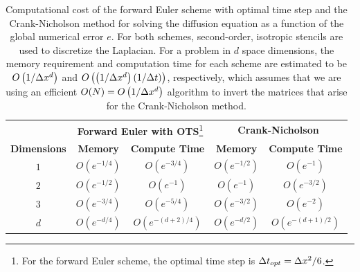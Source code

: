 \documentclass[oneeqnum,onefignum,onetabnum,onethmnum]{siamltex}
\begin{document}
\begin{table}[tb]
\caption{\label{tab:comp_perf_vs_dim}
   Computational cost of the forward Euler scheme with optimal time step and 
   the Crank-Nicholson method for solving the diffusion equation as a function 
   of the global numerical error $e$.
   For both schemes, second-order, isotropic stencils are used to discretize 
   the Laplacian.  For a problem in $d$ space dimensions, the memory 
   requirement and computation time for each scheme are estimated to be 
   $O \left(1/\Delta x^d \right)$ and 
   $O\left( \left(1/\Delta x^d \right) (1/\Delta t) \right)$, respectively, which 
   assumes that we are using an efficient 
   $O(N) = O \left( 1/\Delta x^d \right)$ algorithm to invert the matrices that 
   arise for the Crank-Nicholson method.
}
\begin{minipage}{\textwidth}
\begin{center} \footnotesize
\renewcommand{\arraystretch}{1.5}
\begin{tabular}{|c|c|c|c|c|}
  \hline
  & \multicolumn{2}{|c|}{{\bf Forward Euler with OTS}\footnote{For the forward 
    Euler scheme, the optimal time step is $\Delta t_{opt} = \Delta x^2/6$.}}
  & \multicolumn{2}{|c|}{\bf Crank-Nicholson} \\
  \cline{2-3} \cline{4-5} 
    {\bf Dimensions} & {\bf Memory} & {\bf Compute Time} 
  & {\bf Memory} & {\bf Compute Time} \\
  \hline 
  $1$ & $O\left( e^{-1/4} \right)$ 
      & $O\left( e^{-3/4} \right)$ 
      & $O\left( e^{-1/2} \right)$ 
      & $O\left( e^{-1} \right)$ \\ 
  $2$ & $O\left( e^{-1/2} \right)$ 
      & $O\left( e^{-1} \right)$ 
      & $O\left( e^{-1} \right)$ 
      & $O\left( e^{-3/2} \right)$ \\ 
  $3$ & $O\left( e^{-3/4} \right)$ 
      & $O\left( e^{-5/4} \right)$ 
      & $O\left( e^{-3/2} \right)$ 
      & $O\left( e^{-2} \right)$ \\
  $d$ & $O\left( e^{-d/4} \right)$ 
      & $O\left( e^{-(d+2)/4} \right)$ 
      & $O\left( e^{-d/2} \right)$ 
      & $O\left( e^{-(d+1)/2} \right)$ \\ 
  \hline 
\end{tabular}
\end{center}
\end{minipage}
\end{table}
\end{document}
